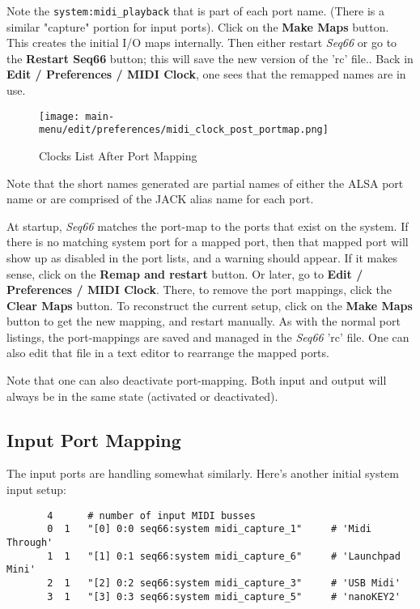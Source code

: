    Note the \texttt{system:midi\_playback} that is part of each port name.
   (There is a similar "capture" portion for input ports).
   Click on the \textbf{Make Maps} button.
   This creates the initial I/O maps internally.
   Then either restart \textsl{Seq66} or go to the \textbf{Restart Seq66}
   button; this will save the new version of the 'rc' file..
   Back in \textbf{Edit / Preferences / MIDI Clock},
   one sees that the remapped names are in use.

\begin{figure}[H]
   \centering 
   \texttt{[image: main-menu/edit/preferences/midi\_clock\_post\_portmap.png]}
   \caption{Clocks List After Port Mapping}
   \label{fig:clocks_list_after_port_mapping}
\end{figure}

   Note that the short names generated are partial names of either the ALSA
   port name or are comprised of the JACK alias name for each port.

   At startup, \textsl{Seq66} matches the port-map to the ports that exist on
   the system.  If there is no matching system port for a mapped port, then
   that mapped port will show up as disabled in the port lists,
   and a warning should appear.
   If it makes sense, click on the \textbf{Remap and restart} button.
   Or later, go to \textbf{Edit / Preferences / MIDI Clock}.
   There, to remove the port mappings, click the \textbf{Clear Maps} button.
   To reconstruct the current setup, click on the \textbf{Make Maps} button to
   get the new mapping, and restart manually.
   As with the normal port listings, the port-mappings are saved and
   managed in the \textsl{Seq66} 'rc' file.
   One can also edit that file in a text editor to
   rearrange the mapped ports.

   Note that one can also deactivate port-mapping. Both input and output
   will always be in the same state (activated or deactivated).

\subsection{Input Port Mapping}
\label{subsec:input_port_mapping}

   The input ports are handling somewhat similarly.  Here's another
   initial system input setup:

   \begin{verbatim}
       4      # number of input MIDI busses
       0  1   "[0] 0:0 seq66:system midi_capture_1"     # 'Midi Through'
       1  1   "[1] 0:1 seq66:system midi_capture_6"     # 'Launchpad Mini'
       2  1   "[2] 0:2 seq66:system midi_capture_3"     # 'USB Midi'
       3  1   "[3] 0:3 seq66:system midi_capture_5"     # 'nanoKEY2'
   \end{verbatim}

